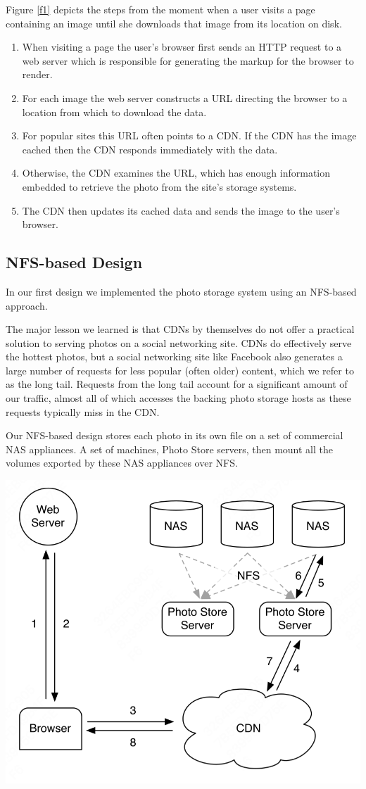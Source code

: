 \documentclass[11pt]{article}
\begin{document}
Figure \ref{f1} depicts the steps from the moment when a user visits a page containing an image until
she downloads that image from its location on disk.
\begin{enumerate}
\item When visiting a page the user’s browser first sends an HTTP request to a web server which is
responsible for generating the markup for the browser to render.
\item For each image the web server constructs a URL directing the browser to a location from which to
download the data.
\item For popular sites this URL often points to a CDN. If the CDN has the image cached then the CDN
responds immediately with the data.
\item Otherwise, the CDN examines the URL, which has enough information embedded to retrieve the photo
from the site’s storage systems.
\item The CDN then updates its cached data and sends the image to the user’s browser.
\end{enumerate}
\subsection{NFS-based Design}
\label{sec:orga02f8ff}
In our first design we implemented the photo storage system using an NFS-based approach.

The major lesson we learned is that CDNs by themselves do not offer a practical solution to serving
photos on a social networking site. CDNs do effectively serve the hottest photos, but a social
networking site like Facebook also generates a large number of requests for less popular (often older)
content, which we refer to as the long tail. Requests from the long tail account for a significant
amount of our traffic, almost all of which accesses the backing photo storage hosts as these requests
typically miss in the CDN.

Our NFS-based design stores each photo in its own file on a set of commercial NAS appliances. A set of
machines, Photo Store servers, then mount all the volumes exported by these NAS appliances over NFS.

\begin{center}
\includegraphics[width=.8\textwidth]{../../images/papers/133.png}
\end{center}
\end{document}
